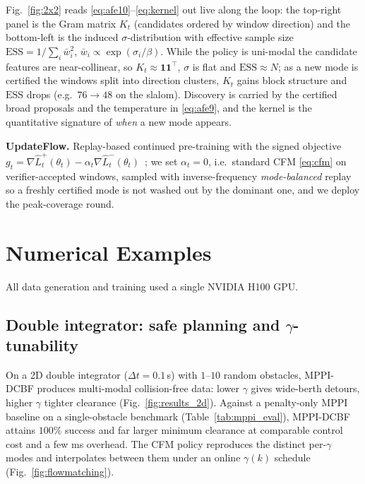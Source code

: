 \documentclass[letterpaper, 10 pt, conference]{ieeeconf}
\begin{document}
Fig.~\ref{fig:2x2} reads \eqref{eq:afe10}--\eqref{eq:kernel} out live along the loop: the top-right panel is the Gram matrix $K_t$ (candidates ordered by window direction) and the bottom-left is the induced $\sigma$-distribution with effective sample size $\mathrm{ESS}=1/\sum_i\bar w_i^2$, $\bar w_i\propto\exp(\sigma_i/\beta)$. While the policy is uni-modal the candidate features are near-collinear, so $K_t\!\approx\!\mathbf 1\mathbf 1^{\!\top}$, $\sigma$ is flat and $\mathrm{ESS}\!\approx\!N$; as a new mode is certified the windows split into direction clusters, $K_t$ gains block structure and $\mathrm{ESS}$ drops (e.g.\ $76\!\to\!48$ on the slalom). Discovery is carried by the certified broad proposals and the temperature in \eqref{eq:afe9}, and the kernel is the quantitative signature of \emph{when} a new mode appears.

\noindent\textbf{UpdateFlow.} Replay-based continued pre-training with the signed objective $g_t=\nabla\hat L_t^{+}(\theta_t)-\alpha_t\nabla\hat L_t^{-}(\theta_t)$~\cite{activeflowexpansion}; we set $\alpha_t=0$, i.e.\ standard CFM \eqref{eq:cfm} on verifier-accepted windows, sampled with inverse-frequency \emph{mode-balanced} replay so a freshly certified mode is not washed out by the dominant one, and we deploy the peak-coverage round.

\section{Numerical Examples}
All data generation and training used a single NVIDIA H100 GPU.

\subsection{Double integrator: safe planning and $\gamma$-tunability}
On a 2D double integrator ($\Delta t=0.1$\,s) with $1$--$10$ random obstacles, MPPI-DCBF produces multi-modal collision-free data: lower $\gamma$ gives wide-berth detours, higher $\gamma$ tighter clearance (Fig.~\ref{fig:results_2d}). Against a penalty-only MPPI baseline on a single-obstacle benchmark (Table~\ref{tab:mppi_eval}), MPPI-DCBF attains $100\%$ success and far larger minimum clearance at comparable control cost and a few ms overhead. The CFM policy reproduces the distinct per-$\gamma$ modes and interpolates between them under an online $\gamma(k)$ schedule (Fig.~\ref{fig:flowmatching}).
\end{document}
